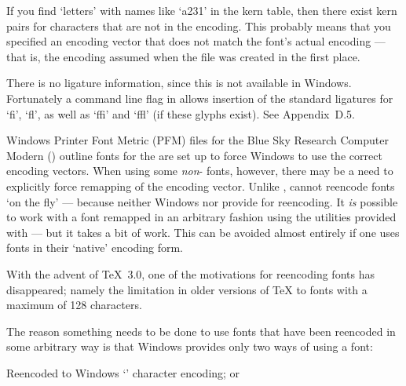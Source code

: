 If you find `letters' with names like `a231' in the kern table, then there
exist kern pairs for characters that are not in the encoding.  This probably
means that you specified an encoding vector that does not match the font's
actual encoding --- that is, the encoding assumed when the {\PFM} file
was created in the first place.

There is no ligature information, since this is not available in Windows.
Fortunately a command line flag in {\AFMTOTFM} allows insertion of the
standard ligatures for `fi', `fl', as well as `ffi'
and `ffl' (if these glyphs exist).  
See Appendix~D.5.



Windows Printer Font Metric (PFM) files for the 
Blue Sky Research Computer Modern ({\CM}) outline fonts for the {\PC} are 
set up to force Windows %
to use the correct encoding vectors. 
When using some {\it non}-{\CM} fonts, however, there may be a need to
explicitly force remapping of the encoding vector.
Unlike {\DVIPSONE}, {\DVIWindo} cannot reencode fonts `on the fly' ---
because neither Windows nor {\ATM} provide for reencoding.
It {\it is\/} possible %
to work with a font remapped in an arbitrary fashion
using the utilities provided with {\DVIWindo} --- but it takes a bit of work.
This can be avoided almost entirely if one uses fonts in their
`native' encoding form.

With the advent of {\TeX}~3.0, one of the motivations for
reencoding fonts  has disappeared; namely the limitation in older
versions of {\TeX} to fonts with a maximum of 128 characters.


The reason something needs to be done to use fonts that have been
reencoded in some arbitrary way is that Windows
provides only two ways of using a font:

\beginbullets

\bpar Reencoded to Windows `{\ANSI}' character encoding; or %

